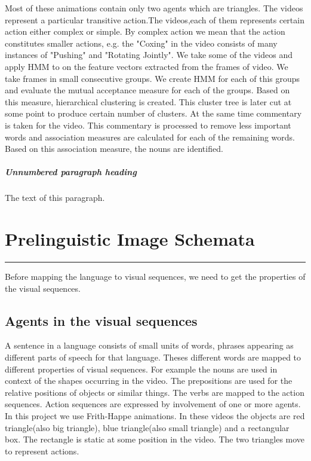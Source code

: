 \def\DevnagVersion{2.15}\documentclass[a4paper, 10pt, notitlepage]{report}
\begin{document}
\hspace*{10pt} Most of these animations contain only two agents which are triangles. The videos represent a particular transitive action.The videos,each of them represents certain action either complex or simple. By complex action we mean that the action constitutes smaller actions, e.g. the "Coxing" in the video consists of many instances of "Pushing" and "Rotating Jointly". We take some of the videos and apply HMM to on the feature vectors extracted from the frames of video. We take frames in small consecutive groups. We create HMM for each of this groups and evaluate the mutual acceptance measure for each of the groups. Based on this measure, hierarchical clustering is created. This cluster tree is later cut at some point to produce certain number of clusters.
\hspace*{10pt} At the same time commentary is taken for the video. This commentary is processed to remove less important words and association measures are calculated for each of the remaining words. Based on this association measure, the nouns are identified.

\paragraph{Unnumbered paragraph heading}
The text of this paragraph.

\chapter{Prelinguistic Image Schemata}
\hrule height 2pt
\vspace*{10pt}
Before mapping the language to visual sequences, we need to get the properties of the visual sequences.\\
\section{Agents in the visual sequences}
A sentence in a language consists of small units of words, phrases appearing as different parts of speech for that language. Theses different words are mapped to different properties of visual sequences. For example the nouns are used in context of the shapes occurring in the video. The prepositions are used for the relative positions of objects or similar things. The verbs are mapped to the action sequences. Action sequences are expressed by involvement of one or more agents.\\
\hspace*{10pt} In this project we use Frith-Happe \cite{fhanimation} animations. In these videos the objects are red triangle(also big triangle), blue triangle(also small triangle) and a rectangular box. The rectangle is static at some position in the video. The two triangles move to represent actions.\\
\end{document}
